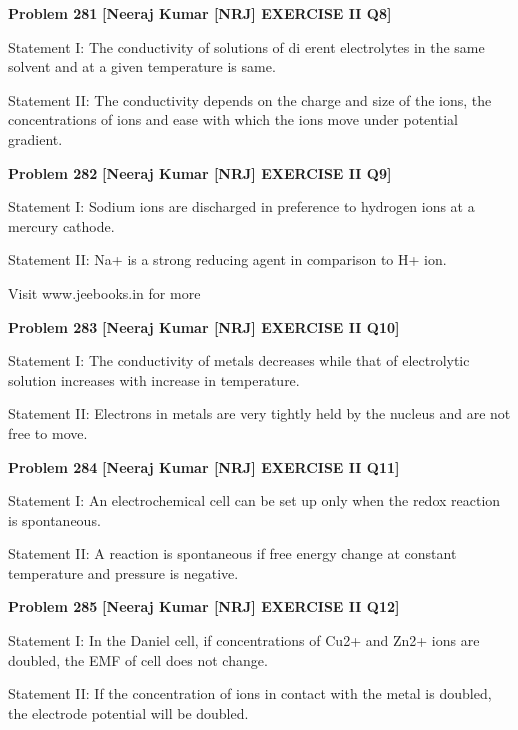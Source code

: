 \begin{problembox}
\textbf{Problem 281} \hfill \textbf{[Neeraj Kumar [NRJ] EXERCISE II Q8]}
\label{q:ext-nrj_all_questions-281}

Statement I: The conductivity of solutions of 
di  erent electrolytes in the same solvent and at a 
given temperature is same.
 
 Statement II: The conductivity depends on the 
charge and size of the ions, the concentrations 
of ions and ease with which the ions move under 
potential gradient.
\end{problembox}

\begin{problembox}
\textbf{Problem 282} \hfill \textbf{[Neeraj Kumar [NRJ] EXERCISE II Q9]}
\label{q:ext-nrj_all_questions-282}

Statement I: Sodium ions are discharged in 
preference to hydrogen ions at a mercury cathode.
 
 Statement II: Na+ is a strong reducing agent in 
comparison to H+ ion.
  
 
 
Visit www.jeebooks.in for more
\end{problembox}

\begin{problembox}
\textbf{Problem 283} \hfill \textbf{[Neeraj Kumar [NRJ] EXERCISE II Q10]}
\label{q:ext-nrj_all_questions-283}

Statement I: The conductivity of metals decreases 
while that of electrolytic solution increases with 
increase in temperature.
 
 Statement II: Electrons in metals are very tightly 
held by the nucleus and are not free to move.
\end{problembox}

\begin{problembox}
\textbf{Problem 284} \hfill \textbf{[Neeraj Kumar [NRJ] EXERCISE II Q11]}
\label{q:ext-nrj_all_questions-284}

Statement I: An electrochemical cell can be set up 
only when the redox reaction is spontaneous.
 
 Statement II: A reaction is spontaneous if free 
energy change at constant temperature and 
pressure is negative.
\end{problembox}

\begin{problembox}
\textbf{Problem 285} \hfill \textbf{[Neeraj Kumar [NRJ] EXERCISE II Q12]}
\label{q:ext-nrj_all_questions-285}

Statement I: In the Daniel cell, if concentrations 
of Cu2+ and Zn2+ ions are doubled, the EMF of 
cell does not change.
 
 Statement II: If the concentration of ions in 
contact with the metal is doubled, the electrode 
potential will be doubled.
\end{problembox}

